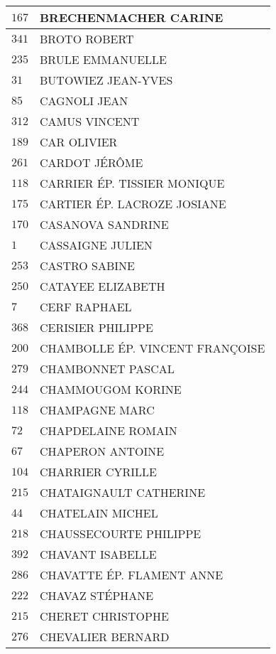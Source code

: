 \begin{xltabular}{\linewidth}{|l|X|}
    \hline
    $167$ & BRECHENMACHER CARINE \\
    \hline
    $341$ & BROTO ROBERT \\
    \hline
    $235$ & BRULE EMMANUELLE \\
    \hline
    $31$ & BUTOWIEZ JEAN-YVES \\
    \hline
    $85$ & CAGNOLI JEAN \\
    \hline
    $312$ & CAMUS VINCENT \\
    \hline
    $189$ & CAR OLIVIER \\
    \hline
    $261$ & CARDOT JÉRÔME \\
    \hline
    $118$ & CARRIER ÉP. TISSIER MONIQUE \\
    \hline
    $175$ & CARTIER ÉP. LACROZE JOSIANE \\
    \hline
    $170$ & CASANOVA SANDRINE \\
    \hline
    $1$ & CASSAIGNE JULIEN \\
    \hline
    $253$ & CASTRO SABINE \\
    \hline
    $250$ & CATAYEE ELIZABETH \\
    \hline
    $7$ & CERF RAPHAEL \\
    \hline
    $368$ & CERISIER PHILIPPE \\
    \hline
    $200$ & CHAMBOLLE ÉP. VINCENT FRANÇOISE \\
    \hline
    $279$ & CHAMBONNET PASCAL \\
    \hline
    $244$ & CHAMMOUGOM KORINE \\
    \hline
    $118$ & CHAMPAGNE MARC \\
    \hline
    $72$ & CHAPDELAINE ROMAIN \\
    \hline
    $67$ & CHAPERON ANTOINE \\
    \hline
    $104$ & CHARRIER CYRILLE \\
    \hline
    $215$ & CHATAIGNAULT CATHERINE \\
    \hline
    $44$ & CHATELAIN MICHEL \\
    \hline
    $218$ & CHAUSSECOURTE PHILIPPE \\
    \hline
    $392$ & CHAVANT ISABELLE \\
    \hline
    $286$ & CHAVATTE ÉP. FLAMENT ANNE \\
    \hline
    $222$ & CHAVAZ STÉPHANE \\
    \hline
    $215$ & CHERET CHRISTOPHE \\
    \hline
    $276$ & CHEVALIER BERNARD \\

\end{xltabular}

